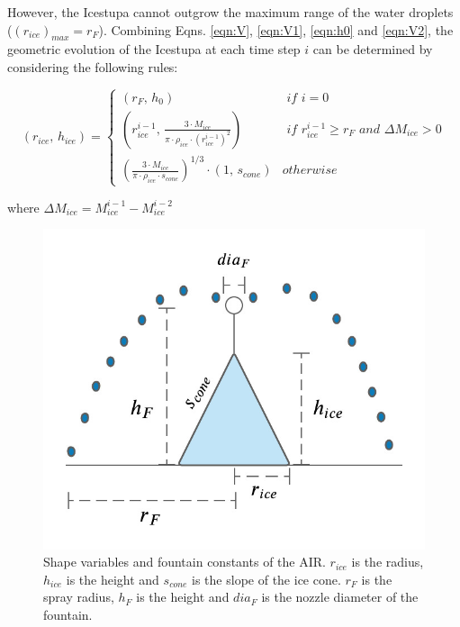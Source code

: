\documentclass[utf8]{frontiersSCNS} %
\begin{document}
However, the Icestupa cannot outgrow the maximum range of the water droplets ($(r_{ice})_{max} = r_{F}$). Combining
Eqns. \ref{eqn:V},  \ref{eqn:V1}, \ref{eqn:h0} and \ref{eqn:V2}, the geometric evolution of the Icestupa at each time step $i$ can
be determined by considering the following rules:

\begin{equation} (r_{ice},\, h_{ice}) = \left\{ \begin{array}{ll} (r_F ,\, h_0)                                                                        & \textit{ if } i=0 \\
             (r_{ice}^{i-1},\, \frac{3 \cdot M_{ice}}{\pi \cdot \rho_{ice} \cdot {(r_{ice}^{i-1})}^2}) & \textit{ if }
             r_{ice}^{i-1} \geq r_{F} \textit{ and } \Delta M_{ice} > 0                                                    \\ (\frac{3 \cdot M_{ice}}{\pi \cdot \rho_{ice} \cdot s_{cone}})^{1/3} \cdot (1,\,  s_{cone}) &
             otherwise\end{array} \right.  \label{eqn:A2} \end{equation}

where $\Delta M_{ice} = M_{ice}^{i-1} - M_{ice}^{i-2}$

\begin{figure} \begin{center} \includegraphics[width=10
			cm]{Figures/Figure_5.jpg} \end{center} \caption{Shape variables and fountain constants of the AIR. $r_{ice}$ is
		the radius, $h_{ice}$ is the height and $s_{cone}$ is the slope of the ice cone. $r_F$ is the spray radius, $h_F$ is the
		height and $dia_F$ is the nozzle diameter of the fountain.} \label{fig:shape} \end{figure}
\end{document}
